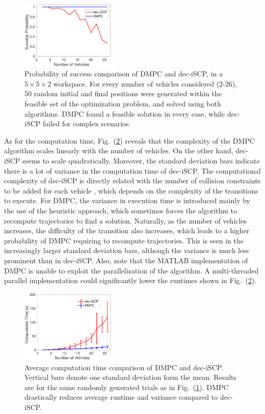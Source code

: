 \begin{figure}[t]
	\centering
	\includegraphics[width=0.4\textwidth]{figures/comp_prob}
	\caption{Probability of success comparison of DMPC and dec-iSCP, in a $5 \times 5 \times 2$ workspace. For every number of vehicles considered (2-26), 50 random initial and final positions were generated within the feasible set of the optimization problem, and solved using both algorithms. DMPC found a feasible solution in every case, while dec-iSCP failed for complex scenarios. }
	\label{fig:comp_prob}
\end{figure}

As for the computation time, Fig.~(\ref{fig:comp_time}) reveals that the complexity of the DMPC algorithm scales linearly with the number of vehicles. On the other hand, dec-iSCP seems to scale quadratically. Moreover, the standard deviation bars indicate there is a lot of variance in the computation time of dec-iSCP. The computational complexity of dec-iSCP is directly related with the number of collision constraints to be added for each vehicle \cite{chen2015decoupled}, which depends on the complexity of the transitions to execute. For DMPC, the variance in execution time is introduced mainly by the use of the heuristic approach, which sometimes forces the algorithm to recompute trajectories to find a solution. Naturally, as the number of vehicles increases, the difficulty of the transition also increases, which leads to a higher probability of DMPC requiring to recompute trajectories. This is seen in the increasingly larger standard deviation bars, although the variance is much less prominent than in dec-iSCP. Also, note that the MATLAB implementation of DMPC is unable to exploit the parallelization of the algorithm. A multi-threaded parallel implementation could significantly lower the runtimes shown in Fig.~(\ref{fig:comp_time}).


\begin{figure}[t]
	\centering
	\includegraphics[width=0.4\textwidth]{figures/comp_time}
	\caption{Average computation time comparison of DMPC and dec-iSCP. Vertical bars denote one standard deviation form the mean. Results are for the same randomly generated trials as in Fig.~(\ref{fig:comp_prob}). DMPC drastically reduces average runtime and variance compared to dec-iSCP.}
	\label{fig:comp_time}
\end{figure}